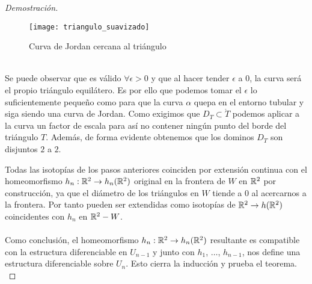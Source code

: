 \begin{proof}[Demostración]
\begin{enumerate}
			\begin{figure}[h]
  				\centering
  				\texttt{[image: triangulo\_suavizado]}
  				\caption{Curva de Jordan cercana al triángulo}
  				\label{fig:triangulo_suavizado}
			\end{figure}
			\\ Se puede observar que es válido $\forall \epsilon > 0$ y que al hacer tender $\epsilon$ a $0$, la curva será el propio triángulo equilátero. Es por ello que podemos tomar el $\epsilon$ lo suficientemente pequeño como para que la curva $\alpha$ quepa en el entorno tubular y siga siendo una curva de Jordan. Como exigimos que $D_T \subset \mathring{T}$ podemos aplicar a la curva un factor de escala para así no contener ningún punto del borde del triángulo $T$. Además, de forma evidente obtenemos que los dominos $D_T$ son disjuntos $2$ a $2$.
		\end{enumerate}

		Todas las isotopías de los pasos anteriores coinciden por extensión continua con el homeomorfismo $h_n:\mathbb{R}^2 \rightarrow h_n(\mathbb{R}^2)$ original en la frontera de $W$ en $\mathbb{R}^2$ por construcción, ya que el diámetro de los triángulos en $W$ tiende a $0$ al acercarnos a la frontera. Por tanto pueden ser extendidas como isotopías de $\mathbb{R}^2 \rightarrow h(\mathbb{R}^2)$ coincidentes con $h_n$ en $\mathbb{R}^2 - W$. \\
		\\ Como conclusión, el homeomorfismo $h_n:\mathbb{R}^2 \rightarrow h_n(\mathbb{R}^2)$ resultante es compatible con la estructura diferenciable en $U_{n-1}$ y junto con $h_1$, $\ldots$, $h_{n-1}$, nos define una estructura diferenciable sobre $U_n$. Esto cierra la inducción y prueba el teorema. \\
	\end{proof}


